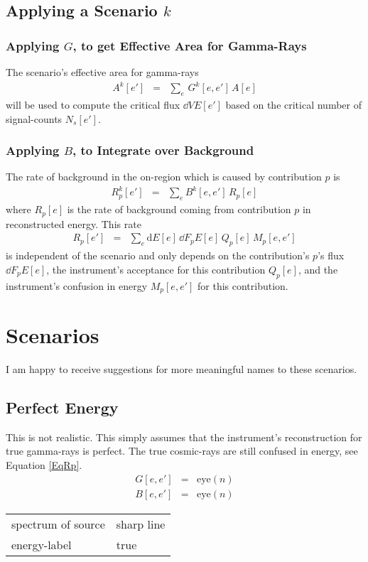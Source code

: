 \documentclass{article}%
\begin{document}
\subsection{Applying a Scenario $k$}
%
\subsubsection*{Applying $G$, to get Effective Area for Gamma-Rays}
%
The scenario's effective area for gamma-rays
%
\begin{eqnarray}
A^k[e'] &=& \sum_{e} \, G^k[e, e'] \, A[e]
\end{eqnarray}
%
will be used to compute the critical flux $\dd{V}{E}[e']$ based on the critical number of signal-counts $N_s[e']$.
%
\subsubsection*{Applying $B$, to Integrate over Background}
%
The rate of background in the on-region which is caused by contribution $p$ is
%
\begin{eqnarray}
R^k_p[e'] &=& \sum_{e} B^k[e, e'] \, R_p[e]
\end{eqnarray}
%
where $R_p[e]$ is the rate of background coming from contribution $p$ in reconstructed energy.
%
This rate
%
\begin{eqnarray}
R_p[e'] &=& \sum_{e} \text{d}E[e] \, \dd{F_p}{E}[e] \, Q_p[e] \, M_p[e, e']
\label{EqRp}
\end{eqnarray}
%
 is independent of the scenario and only depends on the contribution's $p$'s flux $\dd{F_p}{E}[e]$, the instrument's acceptance for this contribution $Q_p[e]$, and the instrument's confusion in energy $M_p[e, e']$ for this contribution.
%
\section{Scenarios}
%
I am happy to receive suggestions for more meaningful names to these scenarios.
%
\subsection{Perfect Energy}
%
This is not realistic. This simply assumes that the instrument's reconstruction for true gamma-rays is perfect.
%
The true cosmic-rays are still confused in energy, see Equation \ref{EqRp}.
%
\begin{eqnarray}
G[e, e'] &=& \mathrm{eye}(n)
\\
B[e, e'] &=& \mathrm{eye}(n)
\end{eqnarray}
%
\begin{center}
\begin{tabular}{ll}
spectrum of source & sharp line\\
energy-label & true\\
\end{tabular}
\end{center}
%
\end{document}

